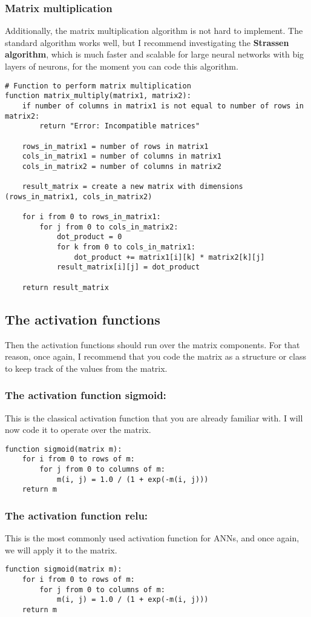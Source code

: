 \subsubsection{Matrix multiplication}
Additionally, the matrix multiplication algorithm is not hard to implement. The standard algorithm works well,
but I recommend investigating the \textbf{Strassen algorithm}, which is much faster and scalable for large
neural networks with big layers of neurons, for the moment you can code this algorithm.
\begin{verbatim}
# Function to perform matrix multiplication
function matrix_multiply(matrix1, matrix2):
    if number of columns in matrix1 is not equal to number of rows in matrix2:
        return "Error: Incompatible matrices"
    
    rows_in_matrix1 = number of rows in matrix1
    cols_in_matrix1 = number of columns in matrix1
    cols_in_matrix2 = number of columns in matrix2
    
    result_matrix = create a new matrix with dimensions (rows_in_matrix1, cols_in_matrix2)
    
    for i from 0 to rows_in_matrix1:
        for j from 0 to cols_in_matrix2:
            dot_product = 0
            for k from 0 to cols_in_matrix1:
                dot_product += matrix1[i][k] * matrix2[k][j]
            result_matrix[i][j] = dot_product
            
    return result_matrix  
\end{verbatim}

\subsection{The activation functions}
Then the activation functions should run over the matrix components. For that reason, once again,
I recommend that you code the matrix as a structure or class to keep track of the values from the matrix.
\subsubsection{The activation function sigmoid:}
This is the classical activation function that you are already familiar with. I will now code it to operate
over the matrix.
\begin{verbatim}
function sigmoid(matrix m):
    for i from 0 to rows of m:
        for j from 0 to columns of m:
            m(i, j) = 1.0 / (1 + exp(-m(i, j)))
    return m
\end{verbatim}
\subsubsection{The activation function relu:}
This is the most commonly used activation function for ANNs, and once again, we will apply it to the matrix.
\begin{verbatim}
function sigmoid(matrix m):
    for i from 0 to rows of m:
        for j from 0 to columns of m:
            m(i, j) = 1.0 / (1 + exp(-m(i, j)))
    return m
\end{verbatim}

